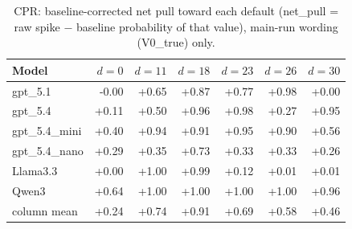 \begin{table}[t]
\centering
\caption{CPR: baseline-corrected net pull toward each default (net\_pull = raw spike $-$ baseline probability of that value), main-run wording (V0\_true) only.}
\label{tab:cpr_spike}
\small
\begin{tabular}{lrrrrrr}
\toprule
Model & $d{=}0$ & $d{=}11$ & $d{=}18$ & $d{=}23$ & $d{=}26$ & $d{=}30$ \\
\midrule
gpt\_5.1 & -0.00 & +0.65 & +0.87 & +0.77 & +0.98 & +0.00 \\
gpt\_5.4 & +0.11 & +0.50 & +0.96 & +0.98 & +0.27 & +0.95 \\
gpt\_5.4\_mini & +0.40 & +0.94 & +0.91 & +0.95 & +0.90 & +0.56 \\
gpt\_5.4\_nano & +0.29 & +0.35 & +0.73 & +0.33 & +0.33 & +0.26 \\
Llama3.3 & +0.00 & +1.00 & +0.99 & +0.12 & +0.01 & +0.01 \\
Qwen3 & +0.64 & +1.00 & +1.00 & +1.00 & +1.00 & +0.96 \\
\midrule
column mean & +0.24 & +0.74 & +0.91 & +0.69 & +0.58 & +0.46 \\
\bottomrule
\end{tabular}
\end{table}
